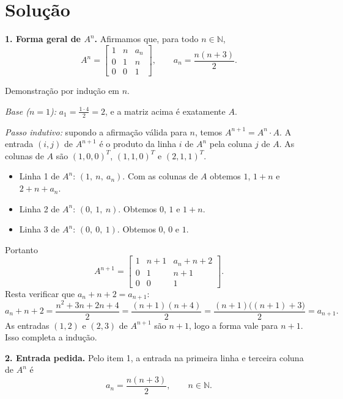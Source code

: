 \documentclass{article}%
\begin{document}
\section*{Solução}

\textbf{1. Forma geral de $A^n$.} Afirmamos que, para todo $n\in\mathbb{N}$,
\begin{equation*}
A^n=\begin{bmatrix}1 & n & a_n\\ 0 & 1 & n\\ 0 & 0 & 1\end{bmatrix},\qquad a_n=\frac{n(n+3)}{2}.
\end{equation*}

Demonstração por indução em $n$.

\emph{Base ($n=1$):} $a_1=\frac{1\cdot 4}{2}=2$, e a matriz acima é exatamente $A$.

\emph{Passo indutivo:} supondo a afirmação válida para $n$, temos $A^{n+1}=A^n\cdot A$. A entrada $(i,j)$ de $A^{n+1}$ é o produto da linha $i$ de $A^n$ pela coluna $j$ de $A$. As colunas de $A$ são $(1,0,0)^T$, $(1,1,0)^T$ e $(2,1,1)^T$.

\begin{itemize}
\item Linha 1 de $A^n$: $(1,\ n,\ a_n)$. Com as colunas de $A$ obtemos $1$, $1+n$ e $2+n+a_n$.
\item Linha 2 de $A^n$: $(0,\ 1,\ n)$. Obtemos $0$, $1$ e $1+n$.
\item Linha 3 de $A^n$: $(0,\ 0,\ 1)$. Obtemos $0$, $0$ e $1$.
\end{itemize}

Portanto
\begin{equation*}
A^{n+1}=\begin{bmatrix}1 & n+1 & a_n+n+2\\ 0 & 1 & n+1\\ 0 & 0 & 1\end{bmatrix}.
\end{equation*}
Resta verificar que $a_n+n+2=a_{n+1}$:
\begin{equation*}
a_n+n+2=\frac{n^2+3n+2n+4}{2}=\frac{(n+1)(n+4)}{2}=\frac{(n+1)\big((n+1)+3\big)}{2}=a_{n+1}.
\end{equation*}
As entradas $(1,2)$ e $(2,3)$ de $A^{n+1}$ são $n+1$, logo a forma vale para $n+1$. Isso completa a indução.

\textbf{2. Entrada pedida.} Pelo item 1, a entrada na primeira linha e terceira coluna de $A^n$ é
\begin{equation*}
a_n=\frac{n(n+3)}{2}, \qquad n\in\mathbb{N}.
\end{equation*}
\end{document}
